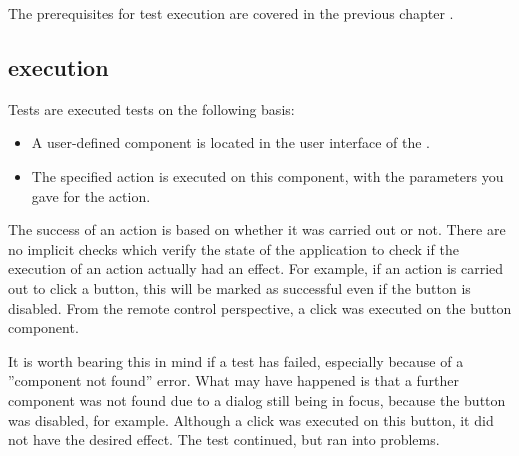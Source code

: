 
The prerequisites for test execution are covered in the previous chapter . 


\subsection{\gdstep{} execution}
Tests are  executed tests on the following basis: 
\begin{itemize}
\item A user-defined component is located in the user interface of the \gdaut{}. 
\item The specified action is executed on this component, with the parameters you gave for the action. 
\end{itemize}

The success of an action is based on whether it was carried out or not. There are no implicit checks which verify the state of the application to check if the execution of an action actually had an effect. For example, if an action is carried out to click a button, this \gdstep{} will be marked as successful even if the button is disabled. From the remote control perspective, a click was executed on the button component. 

It is worth bearing this in mind if a test has failed, especially because of a ''component not found'' error. What may have happened is that a further component was not found due to a dialog still being in focus, because the  button  was disabled, for example. Although a click was executed on this button, it did not have the desired effect. The test continued, but ran into problems. 
